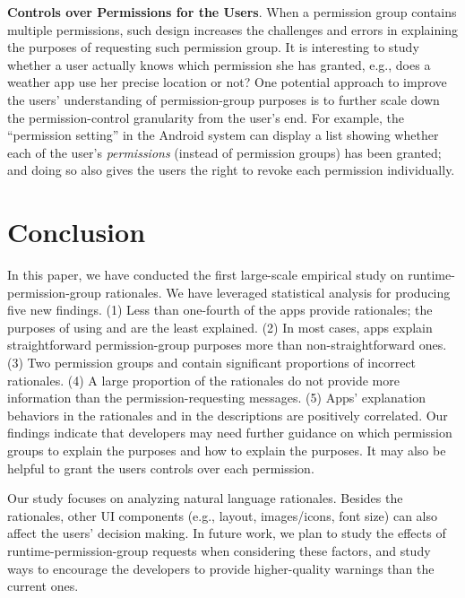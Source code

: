 \textbf{Controls over Permissions for the Users}. When a permission group contains multiple permissions, such design increases the challenges and errors in explaining the purposes of requesting such permission group.  
It is interesting to study whether a user actually knows which permission she has granted, e.g., does a weather app use her precise location or not? 
One potential approach to improve the users' understanding of permission-group purposes is to further scale down the permission-control granularity from the user's end. 
For example, the ``permission setting'' in the Android system can display a list showing whether each of the user's \emph{permissions} (instead of permission groups) has been granted; and doing so also gives the users the right to revoke each permission individually. 

\vspace{-0.07in}
\section{Conclusion}
\label{sec:conclusion}

In this paper, we have conducted the first large-scale empirical study on runtime-permission-group rationales. 
We have leveraged statistical analysis for producing five new findings. 
(1) Less than one-fourth of the apps provide rationales; the purposes of using  and  are the least explained. 
(2) In most cases, apps explain straightforward permission-group purposes more than non-straightforward ones. 
(3) Two permission groups  and  contain significant proportions of incorrect rationales. 
(4) A large proportion of the rationales do not provide more information than the permission-requesting messages. 
(5) Apps' explanation behaviors in the rationales and in the descriptions are positively correlated. 
Our findings indicate that developers may need further guidance on which permission groups to explain the purposes and how to explain the purposes. 
It may also be helpful to grant the users controls over each permission. 

Our study focuses on analyzing natural language rationales. 
Besides the rationales, other UI components (e.g., layout, images/icons, font size) can also affect the users' decision making. 
In future work, we plan to study the effects of runtime-permission-group requests when considering these factors, and study ways to encourage the developers to provide higher-quality warnings than the current ones. 

